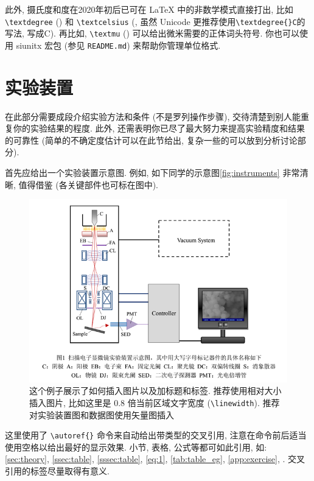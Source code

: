 \documentclass[font=notofandol]{mpltx}
\newcommand{\note}[1]{{\color{gray}#1}}
\begin{document}
\note{此外, 摄氏度和度在2020年初后已可在 \LaTeX{} 中的非数学模式直接打出, 比如 \texttt{\textbackslash{}textdegree} (\textdegree) 和 \texttt{\textbackslash{}textcelsius} (\textcelsius, 虽然 Unicode 更推荐使用\texttt{\textbackslash{}textdegree\{\}C}的写法, 写成\textdegree{}C).
    再比如, \texttt{\textbackslash{}textmu} (\textmu) 可以给出微米需要的正体词头符号.
    你也可以使用 \textsf{siunitx} 宏包 (参见 \texttt{README.md}) 来帮助你管理单位格式.}

\section{实验装置}
在此部分需要成段介绍实验方法和条件 (不是罗列操作步骤), 交待清楚到别人能重复你的实验结果的程度.
此外, 还需表明你已尽了最大努力来提高实验精度和结果的可靠性 (简单的不确定度估计可以在此节给出, 复杂一些的可以放到分析讨论部分).

首先应给出一个实验装置示意图.
例如, 如下同学的示意图\autoref{fig:instruments} 非常清晰, 值得借鉴 (各关键部件也可标在图中).

\begin{figure}
    \centering
    \includegraphics[width=0.85\linewidth]{fig/instruments.png}
    \caption{这个例子展示了如何插入图片以及加标题和标签.
        \note{推荐使用相对大小插入图片, 比如这里是 0.8 倍当前区域文字宽度 (\texttt{\textbackslash{}linewidth}).
            推荐对实验装置图和数据图使用矢量图插入}}
    \label{fig:instruments}
\end{figure}

\note{这里使用了 \texttt{\textbackslash{}autoref\{\}} 命令来自动给出带类型的交叉引用, 注意在命令前后适当使用空格以给出最好的显示效果.
    小节, 表格, 公式等都可如此引用, 如: \autoref{sec:theory}, \autoref{ssec:table}, \autoref{sssec:table}, \autoref{eq:1}, \autoref{tab:table_eg}, \autoref{app:exercise}, \autopageref{tab:table_eg}.
    交叉引用的标签尽量取得有意义.}
\end{document}
